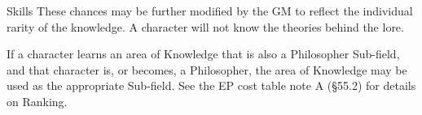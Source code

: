 \begin{Chapter}{Skills}
These chances may be further modified by the GM to reflect the
individual rarity of the knowledge.  A character will not know the
theories behind the lore.

If a character learns an area of Knowledge that is also a Philosopher
Sub-field, and that character is, or becomes, a Philosopher, the area
of Knowledge may be used as the appropriate Sub-field.  See the EP
cost table note A (§55.2) for details on Ranking.

\end{Chapter}
